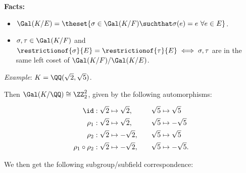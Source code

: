 \textbf{Facts:}

\begin{itemize}
\item
  \(\Gal(K/E) = \theset{\sigma \in \Gal(K/F) \suchthat \sigma(e) = e ~\forall e\in E}\).
\item
  \(\sigma, \tau \in \Gal(K/F)\) and
  \(\restrictionof{\sigma}{E} = \restrictionof{\tau}{E} \iff \sigma, \tau\)
  are in the same left coset of \(\Gal(K/F) / \Gal(K/E)\).
\end{itemize}

\emph{Example}: \(K = \QQ(\sqrt 2, \sqrt 5)\).

Then \(\Gal(K/\QQ) \cong \ZZ_2^2\), given by the following
automorphisms:

\begin{align*}
\id:     \sqrt 2 &\mapsto \sqrt 2,  \quad& \sqrt 5 &\mapsto \sqrt 5 \\
\rho_1:  \sqrt 2 &\mapsto \sqrt 2,  \quad& \sqrt 5 &\mapsto -\sqrt 5 \\
\rho_2:  \sqrt 2 &\mapsto -\sqrt 2, \quad& \sqrt 5 &\mapsto \sqrt 5 \\
\rho_1 \circ \rho_2:  \sqrt 2 &\mapsto -\sqrt 2, \quad& \sqrt 5 &\mapsto -\sqrt 5 
.\end{align*}

We then get the following subgroup/subfield correspondence:


